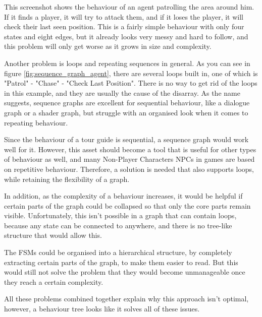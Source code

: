 This screenshot shows the behaviour of an agent patrolling the area around him. If it finds a player, it will try to attack them, and if it loses the player, it will check their last seen position. This is a fairly simple behaviour with only four states and eight edges, but it already looks very messy and hard to follow, and this problem will only get worse as it grows in size and complexity.

Another problem is loops and repeating sequences in general. As you can see in figure \ref{fig:sequence_graph_agent}, there are several loops built in, one of which is "Patrol" - "Chase" - "Check Last Position". There is no way to get rid of the loops in this example, and they are usually the cause of the disarray. As the name suggests, sequence graphs are excellent for sequential behaviour, like a dialogue graph or a shader graph, but struggle with an organised look when it comes to repeating behaviour.

Since the behaviour of a tour guide is sequential, a sequence graph would work well for it. However, this asset should become a tool that is useful for other types of behaviour as well, and many Non-Player Characters NPCs in games are based on repetitive behaviour. Therefore, a solution is needed that also supports loops, while retaining the flexibility of a graph.

In addition, as the complexity of a behaviour increases, it would be helpful if certain parts of the graph could be collapsed so that only the core parts remain visible. Unfortunately, this isn't possible in a graph that can contain loops, because any state can be connected to anywhere, and there is no tree-like structure that would allow this.

The FSMs could be organised into a hierarchical structure, by completely extracting certain parts of the graph, to make them easier to read. But this would still not solve the problem that they would become unmanageable once they reach a certain complexity.

All these problems combined together explain why this approach isn't optimal, however, a behaviour tree looks like it solves all of these issues.